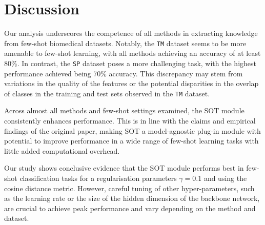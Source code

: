 \section{Discussion}

Our analysis underscores the competence of all methods in extracting knowledge from few-shot biomedical datasets. Notably, the \texttt{TM} dataset seems to be more amenable to few-shot learning, with all methods achieving an accuracy of at least 80\%. In contrast, the \texttt{SP} dataset poses a more challenging task, with the highest performance achieved being 70\% accuracy. This discrepancy may stem from variations in the quality of the features or the potential disparities in the overlap of classes in the training and test sets observed in the \texttt{TM} dataset.

Across almost all methods and few-shot settings examined, the SOT module consistently enhances performance. This is in line with the claims and empirical findings of the original paper, making SOT a model-agnostic plug-in module with potential to improve performance in a wide range of few-shot learning tasks with little added computational overhead.

Our study shows conclusive evidence that the SOT module performs best in few-shot classification tasks for a regularisation parameters $\gamma = 0.1$ and using the cosine distance metric. However, careful tuning of other hyper-parameters, such as the learning rate or the size of the hidden dimension of the backbone network, are crucial to achieve peak performance and vary depending on the method and dataset.